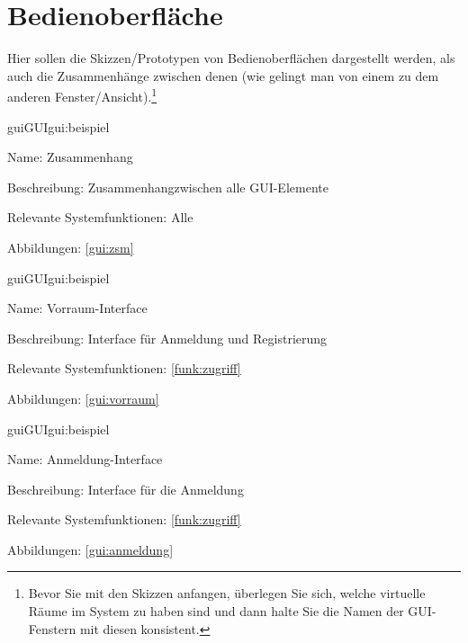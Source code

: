 
\section{Bedienoberfläche}

Hier sollen die Skizzen/Prototypen von Bedienoberflächen dargestellt werden, als auch die Zusammenhänge zwischen denen (wie gelingt man von einem zu dem anderen Fenster/Ansicht).\footnote{Bevor Sie mit den Skizzen anfangen, überlegen Sie sich, welche virtuelle Räume im System zu haben sind und dann halte Sie die Namen der GUI-Fenstern mit diesen konsistent.}

\setcounter{gui}{10}


\begin{description}[leftmargin=5em, style=sameline]	
	\begin{lhp}{gui}{GUI}{gui:beispiel}
		\item[Name:] Zusammenhang
		\item[Beschreibung:] Zusammenhangzwischen alle GUI-Elemente
		\item[Relevante Systemfunktionen:] Alle
		\item[Abbildungen:] \ref{gui:zsm}
	\end{lhp}
\end{description}

\begin{description}[leftmargin=5em, style=sameline]	
	\begin{lhp}{gui}{GUI}{gui:beispiel}
		\item[Name:] Vorraum-Interface
		\item[Beschreibung:] Interface für Anmeldung und Registrierung
		\item[Relevante Systemfunktionen:] \ref{funk:zugriff}
		\item[Abbildungen:] \ref{gui:vorraum}
	\end{lhp}
\end{description}

\begin{description}[leftmargin=5em, style=sameline]	
	\begin{lhp}{gui}{GUI}{gui:beispiel}
		\item[Name:] Anmeldung-Interface
		\item[Beschreibung:] Interface für die Anmeldung
		\item[Relevante Systemfunktionen:] \ref{funk:zugriff}
		\item[Abbildungen:] \ref{gui:anmeldung}
	\end{lhp}
\end{description}

